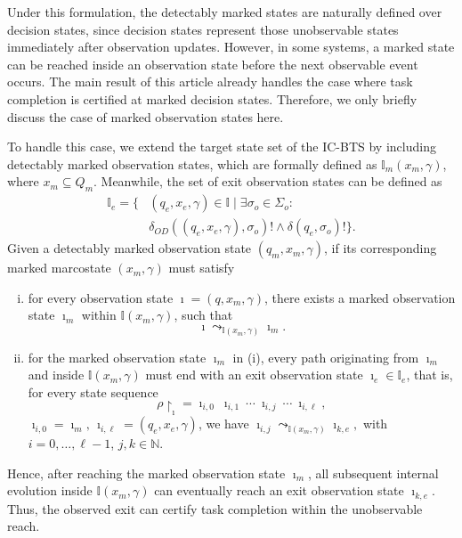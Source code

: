 \documentclass[twocolumn]{autart}
\begin{document}
Under this formulation, the detectably marked states are naturally defined over decision states, since decision states represent those unobservable states immediately after observation updates.
However, in some systems, a marked state can be reached inside an observation state before the next observable event occurs.
%
The main result of this article already handles the case where task completion is certified at marked decision states. Therefore, we only briefly discuss the case of marked observation states here.

To handle this case, we extend the target state set of the IC-BTS by including detectably marked observation states, which are formally defined as $\mathbb{I}_{m}(x_m, \gamma)$, where $x_{m} \subseteq Q_m$.
Meanwhile, the set of exit observation states can be defined as
$$
\begin{aligned}
    \mathbb{I}_{e} =
    \{ &(q_e, x_e, \gamma) \in \mathbb{I} \mid
    \exists \sigma_o \in \Sigma_o : \\
       &\delta_{OD}((q_e, x_e, \gamma), \sigma_o)! \wedge \delta(q_e,\sigma_o)! \}.        
\end{aligned}
$$
%
Given a detectably marked observation state $(q_m, x_m, \gamma)$, if its corresponding marked marcostate $(x_m, \gamma)$ must satisfy
\begin{enumerate}[(i)]
    \item for every observation state $\imath = (q, x_m, \gamma)$, there exists a marked observation state $\imath_m$ within $\mathbb{I}(x_m, \gamma)$, such that
    $$
        \imath \leadsto_{\mathbb{I}(x_m,\gamma)} \imath_m.
    $$

    \item for the marked observation state $\imath_m$ in (i), every path originating from $\imath_m$ and inside $\mathbb{I}(x_m,\gamma)$ must end with an exit observation state $\imath_e \in \mathbb{I}_{e}$, that is, for every state sequence
    $$
        \rho\restriction_{\imath} = \imath_{i,0} \ \imath_{i,1} \ \cdots \ \imath_{i,j} \ \cdots \ \imath_{i,\ell},
    $$
    $\imath_{i,0} = \imath_m, \, \imath_{i,\ell} = (q_e, x_e, \gamma)$, we have
    $
        \imath_{i,j} \leadsto_{\mathbb{I}(x_m,\gamma)} \imath_{k,e},
    $
    with $i = 0, \ldots , \ell - 1$, $j,k \in \mathbb{N}$.
\end{enumerate}
%
Hence, after reaching the marked observation state $\imath_m$, all subsequent internal evolution inside $\mathbb{I}(x_m,\gamma)$ can eventually reach an exit observation state $\imath_{k,e}$.
%
Thus, the observed exit can certify task completion within the unobservable reach.
\end{document}
